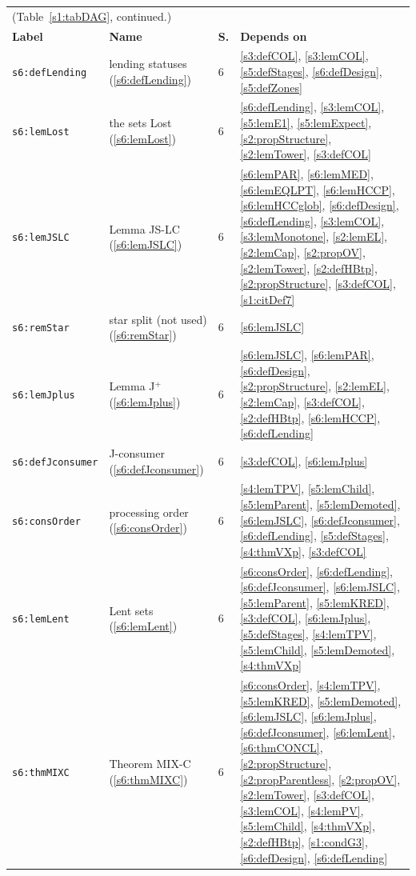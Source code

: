 \begin{center}
{\footnotesize
\setlength{\tabcolsep}{3pt}
\begin{tabular}{p{3.2cm}p{3.6cm}p{0.5cm}p{7.6cm}}
\multicolumn{4}{l}{(Table~\ref{s1:tabDAG}, continued.)}\\
\textbf{Label} & \textbf{Name} & \textbf{S.} & \textbf{Depends on}\\
\hline
\texttt{s6:defLending} & lending statuses (\ref{s6:defLending}) & 6 & \ref{s3:defCOL}, \ref{s3:lemCOL}, \ref{s5:defStages}, \ref{s6:defDesign}, \ref{s5:defZones}\\
\texttt{s6:lemLost} & the sets Lost (\ref{s6:lemLost}) & 6 & \ref{s6:defLending}, \ref{s3:lemCOL}, \ref{s5:lemE1}, \ref{s5:lemExpect}, \ref{s2:propStructure}, \ref{s2:lemTower}, \ref{s3:defCOL}\\
\texttt{s6:lemJSLC} & Lemma JS-LC (\ref{s6:lemJSLC}) & 6 & \ref{s6:lemPAR}, \ref{s6:lemMED}, \ref{s6:lemEQLPT}, \ref{s6:lemHCCP}, \ref{s6:lemHCCglob}, \ref{s6:defDesign}, \ref{s6:defLending}, \ref{s3:lemCOL}, \ref{s3:lemMonotone}, \ref{s2:lemEL}, \ref{s2:lemCap}, \ref{s2:propOV}, \ref{s2:lemTower}, \ref{s2:defHBtp}, \ref{s2:propStructure}, \ref{s3:defCOL}, \ref{s1:citDef7}\\
\texttt{s6:remStar} & star split (not used) (\ref{s6:remStar}) & 6 & \ref{s6:lemJSLC}\\
\texttt{s6:lemJplus} & Lemma J$^+$ (\ref{s6:lemJplus}) & 6 & \ref{s6:lemJSLC}, \ref{s6:lemPAR}, \ref{s6:defDesign}, \ref{s2:propStructure}, \ref{s2:lemEL}, \ref{s2:lemCap}, \ref{s3:defCOL}, \ref{s2:defHBtp}, \ref{s6:lemHCCP}, \ref{s6:defLending}\\
\texttt{s6:defJconsumer} & J-consumer (\ref{s6:defJconsumer}) & 6 & \ref{s3:defCOL}, \ref{s6:lemJplus}\\
\texttt{s6:consOrder} & processing order (\ref{s6:consOrder}) & 6 & \ref{s4:lemTPV}, \ref{s5:lemChild}, \ref{s5:lemParent}, \ref{s5:lemDemoted}, \ref{s6:lemJSLC}, \ref{s6:defJconsumer}, \ref{s6:defLending}, \ref{s5:defStages}, \ref{s4:thmVXp}, \ref{s3:defCOL}\\
\texttt{s6:lemLent} & Lent sets (\ref{s6:lemLent}) & 6 & \ref{s6:consOrder}, \ref{s6:defLending}, \ref{s6:defJconsumer}, \ref{s6:lemJSLC}, \ref{s5:lemParent}, \ref{s5:lemKRED}, \ref{s3:defCOL}, \ref{s6:lemJplus}, \ref{s5:defStages}, \ref{s4:lemTPV}, \ref{s5:lemChild}, \ref{s5:lemDemoted}, \ref{s4:thmVXp}\\
\texttt{s6:thmMIXC} & Theorem MIX-C (\ref{s6:thmMIXC}) & 6 & \ref{s6:consOrder}, \ref{s4:lemTPV}, \ref{s5:lemKRED}, \ref{s5:lemDemoted}, \ref{s6:lemJSLC}, \ref{s6:lemJplus}, \ref{s6:defJconsumer}, \ref{s6:lemLent}, \ref{s6:thmCONCL}, \ref{s2:propStructure}, \ref{s2:propParentless}, \ref{s2:propOV}, \ref{s2:lemTower}, \ref{s3:defCOL}, \ref{s3:lemCOL}, \ref{s4:lemPV}, \ref{s5:lemChild}, \ref{s4:thmVXp}, \ref{s2:defHBtp}, \ref{s1:condG3}, \ref{s6:defDesign}, \ref{s6:defLending}\\
\hline
\end{tabular}}
\end{center}

